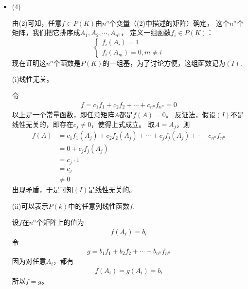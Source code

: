 \documentclass{article}
\begin{document}
\begin{itemize}
        可以先看(4)，通过其中(ii)的描述，就可以表示出想要的函数了。

  \item (4)

        由(2)可知，任意$f \in P(K)$由$n^n$个变量（(2)中描述的矩阵）确定，
        这个$n^n$个矩阵，我们把它排序成$A_1, A_2, \cdots, A_{n^n}$，
        定义一组函数$f_i \in P(K)$：
        \begin{equation*}
          \begin{cases}
            f_i(A_i) = 1 \\
            f_i(A_m) = 0, m \neq i
          \end{cases}
        \end{equation*}
        现在证明这$n^n$个函数是$P(K)$的一组基，为了讨论方便，这组函数记为$(I)$.

        (i)线性无关。

        令
        \begin{align*}
          f = c_1 f_1 + c_2 f_2 + \cdots + c_{n^n} f_{n^n} = 0
        \end{align*}
        以上是一个常量函数，即任意矩阵$A$都是$f(A) = 0$。
        反证法，假设$(I)$不是线性无关的，即存在$c_j \neq 0$，使得上式成立。
        取$A = A_j$，则
        \begin{align*}
          f(A) & = c_1 f_1(A_j) + c_2 f_2(A_j) + \cdots + c_j f_j(A_j) + \cdot + c_{n^n} f_{n^n} \\
               & = 0 + c_j f_j(A_j)                                                              \\
               & = c_j \cdot 1                                                                   \\
               & = c_j                                                                           \\
               & \neq 0
        \end{align*}
        出现矛盾，于是可知$(I)$是线性无关的。

        (ii)可以表示$P(k)$中的任意列线性函数$f$.

        设$f$在$n^n$个矩阵上的值为
        \begin{align*}
          f(A_i) = b_i
        \end{align*}
        令
        \begin{align*}
          g = b_1 f_1 + b_2 f_2 + \cdots + b_{n^n} f_{n^n}
        \end{align*}
        因为对任意$A_i$，都有
        \begin{align*}
          f(A_i) = g(A_i) = b_i
        \end{align*}
        所以$f = g$。


\end{itemize}
\end{document}
